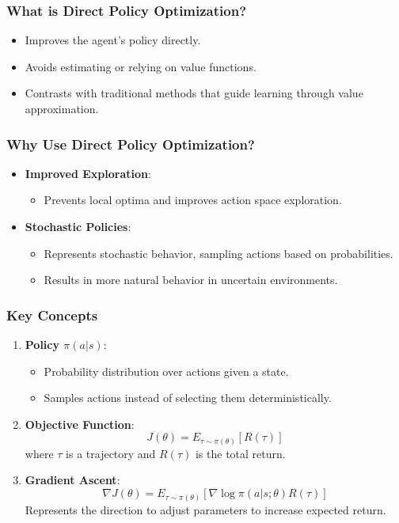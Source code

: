 \documentclass[aspectratio=169]{beamer}
\begin{document}
\begin{frame}[fragile]
    \frametitle{What is Direct Policy Optimization?}
    \begin{itemize}
        \item Improves the agent's policy directly.
        \item Avoids estimating or relying on value functions.
        \item Contrasts with traditional methods that guide learning through value approximation.
    \end{itemize}
\end{frame}

\begin{frame}[fragile]
    \frametitle{Why Use Direct Policy Optimization?}
    \begin{itemize}
        \item \textbf{Improved Exploration}:
            \begin{itemize}
                \item Prevents local optima and improves action space exploration.
            \end{itemize}
        \item \textbf{Stochastic Policies}:
            \begin{itemize}
                \item Represents stochastic behavior, sampling actions based on probabilities.
                \item Results in more natural behavior in uncertain environments.
            \end{itemize}
    \end{itemize}
\end{frame}

\begin{frame}[fragile]
    \frametitle{Key Concepts}
    \begin{enumerate}
        \item \textbf{Policy $\pi(a|s)$}:
            \begin{itemize}
                \item Probability distribution over actions given a state.
                \item Samples actions instead of selecting them deterministically.
            \end{itemize}
        \item \textbf{Objective Function}:
            \begin{equation}
                J(\theta) = E_{\tau \sim \pi(\theta)} \left[ R(\tau) \right]
            \end{equation}
            where \( \tau \) is a trajectory and \( R(\tau) \) is the total return.
        \item \textbf{Gradient Ascent}:
            \begin{equation}
                \nabla J(\theta) = E_{\tau \sim \pi(\theta)} \left[ \nabla \log \pi(a|s; \theta) R(\tau) \right]
            \end{equation}
            Represents the direction to adjust parameters to increase expected return.
    \end{enumerate}
\end{frame}
\end{document}
